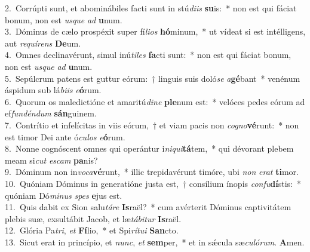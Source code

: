 {2.~}Corrúpti sunt, et abominábiles facti sunt in stú\textit{di}\textit{is} \textbf{su}is:~* non est qui fáciat bonum, non est \textit{us}\textit{que} \textit{ad} \textbf{u}num.\\
{3.~}Dóminus de cælo prospéxit super fí\textit{li}\textit{os} \textbf{hó}minum,~* ut vídeat si est intélligens, aut \textit{re}\textit{quí}\textit{rens} \textbf{De}um.\\
{4.~}Omnes declinavérunt, simul inú\textit{ti}\textit{les} \textbf{fa}cti sunt:~* non est qui fáciat bonum, non est \textit{us}\textit{que} \textit{ad} \textbf{u}num.\\
{5.~}Sepúlcrum patens est guttur eórum:~† linguis suis doló\textit{se} \textit{a}\textbf{gé}bant~* venénum áspidum sub lá\textit{bi}\textit{is} \textit{e}\textbf{ó}rum.\\
{6.~}Quorum os maledictióne et amaritú\textit{di}\textit{ne} \textbf{ple}num est:~* velóces pedes eórum ad ef\textit{fun}\textit{dén}\textit{dum} \textbf{sán}guinem.\\
{7.~}Contrítio et infelícitas in viis eórum,~† et viam pacis non \textit{co}\textit{gno}\textbf{vé}runt:~* non est timor Dei ante ó\textit{cu}\textit{los} \textit{e}\textbf{ó}rum.\\
{8.~}Nonne cognóscent omnes qui operántur i\textit{ni}\textit{qui}\textbf{tá}tem,~* qui dévorant plebem meam si\textit{cut} \textit{e}\textit{scam} \textbf{pa}nis?\\
{9.~}Dóminum non in\textit{vo}\textit{ca}\textbf{vé}runt,~* illic trepidavérunt timóre, ubi \textit{non} \textit{e}\textit{rat} \textbf{ti}mor.\\
{10.~}Quóniam Dóminus in generatióne justa est,~† consílium ínopis \textit{con}\textit{fu}\textbf{dí}stis:~* quóniam Dó\textit{mi}\textit{nus} \textit{spes} \textbf{e}jus est.\\
{11.~}Quis dabit ex Sion salu\textit{tá}\textit{re} \textbf{Is}raël?~* cum avérterit Dóminus captivitátem plebis suæ, exsultábit Jacob, et læ\textit{tá}\textit{bi}\textit{tur} \textbf{Is}raël.\\
{12.~}Glória Pa\textit{tri}, \textit{et} \textbf{Fí}lio,~* et Spi\textit{rí}\textit{tu}\textit{i} \textbf{San}cto.\\
{13.~}Sicut erat in princípio, et \textit{nunc}, \textit{et} \textbf{sem}per,~* et in sǽcula sæ\textit{cu}\textit{ló}\textit{rum}. \textbf{A}men.\\

